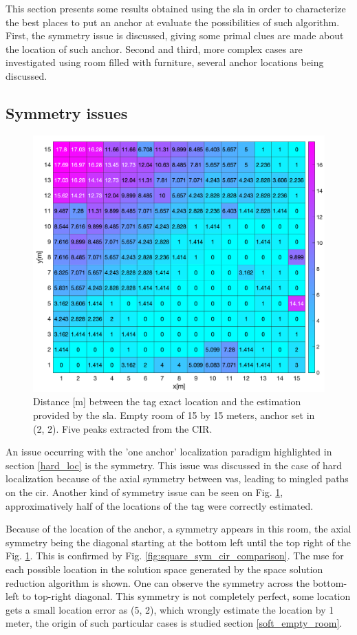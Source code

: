 This section presents some results obtained using the \gls{sla} in order to characterize the best places to put an anchor at evaluate the possibilities of such algorithm. First, the symmetry issue is discussed, giving some primal clues are made about the location of such anchor. Second and third, more complex cases are investigated using room filled with furniture, several anchor locations being discussed.

\subsection{Symmetry issues}

\begin{figure}[H]
\centering
\includegraphics[width=.73\linewidth]{Images/15_15_sym.png}
\caption{Distance [m] between the tag exact location and the estimation provided by the \gls{sla}. Empty room of 15 by 15 meters, anchor set in (2, 2). Five peaks extracted from the CIR. \label{fig:square_sym}}
\end{figure}

An issue occurring with the 'one anchor' localization paradigm highlighted in section \ref{hard_loc} is the symmetry. This issue was discussed in the case of hard localization because of the axial symmetry between \glspl{va}, leading to mingled paths on the \gls{cir}. Another kind of symmetry issue can be seen on Fig. \ref{fig:square_sym}, approximatively half of the locations of the tag were correctly estimated.
\vspace{2mm}

Because of the location of the anchor, a symmetry appears in this room, the axial symmetry being the diagonal starting at the bottom left until the top right of the Fig. \ref{fig:square_sym}. This is confirmed by Fig. \ref{fig:square_sym_cir_comparison}. The \gls{mse} for each possible location in the solution space generated by the space solution reduction algorithm is shown. One can observe the symmetry across the bottom-left to top-right diagonal. This symmetry is not completely perfect, some location gets a small location error as (5, 2), which wrongly estimate the location by 1 meter, the origin of such particular cases is studied section \ref{soft_empty_room}.

